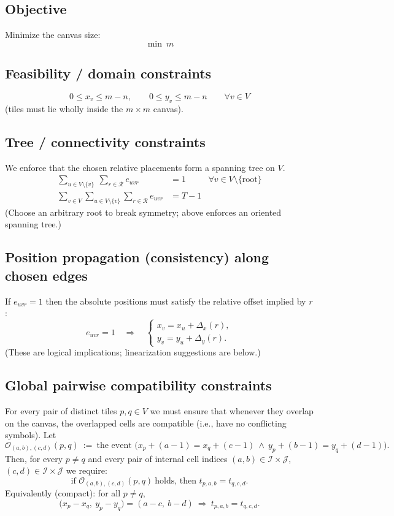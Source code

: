 \documentclass{article}
\begin{document}
\subsection*{Objective}
Minimize the canvas size:
\[
\min\ m
\]

\subsection*{Feasibility / domain constraints}
\[
0 \le x_v \le m-n,\qquad 0 \le y_v \le m-n \qquad \forall v\in V
\]
(tiles must lie wholly inside the \(m\times m\) canvas).

\subsection*{Tree / connectivity constraints}
We enforce that the chosen relative placements form a spanning tree on \(V\).
\begin{align}
\sum_{u\in V\setminus\{v\}}\ \sum_{r\in\mathcal{R}} e_{uvr} &= 1 &\forall v\in V\setminus\{\text{root}\} 
\tag{each non-root has exactly one parent (arborescence)}\\
\sum_{v\in V}\sum_{u\in V\setminus\{v\}}\sum_{r\in\mathcal{R}} e_{uvr} &= T-1
\tag{total edges = $T-1$}\label{eq:tree_edges}
\end{align}
(Choose an arbitrary root to break symmetry; above enforces an oriented spanning tree.)

\subsection*{Position propagation (consistency) along chosen edges}
If \(e_{uvr}=1\) then the absolute positions must satisfy the relative offset implied by \(r\):
\[
e_{uvr}=1 \quad\Longrightarrow\quad
\begin{cases}
x_v = x_u + \Delta_x(r),\\[4pt]
y_v = y_u + \Delta_y(r).
\end{cases}
\tag{position propagation}
\]
(These are logical implications; linearization suggestions are below.)

\subsection*{Global pairwise compatibility constraints}
For every pair of distinct tiles \(p,q\in V\) we must ensure that whenever they overlap on the canvas, the overlapped cells are compatible (i.e., have no conflicting symbols). Let
\[
\mathcal{O}_{(a,b),(c,d)}(p,q)\ :=\ \text{the event } \big(x_p + (a-1) = x_q + (c-1)\ \wedge\ y_p + (b-1) = y_q + (d-1)\big).
\]
Then, for every \(p\ne q\) and every pair of internal cell indices \((a,b)\in\mathcal{I}\times\mathcal{J}\), \((c,d)\in\mathcal{I}\times\mathcal{J}\) we require:
\[
\text{if } \mathcal{O}_{(a,b),(c,d)}(p,q)\ \text{holds, then } t_{p,a,b} = t_{q,c,d}.
\tag{compatibility}
\]
Equivalently (compact): for all \(p\ne q\),
\[
\bigl(x_p-x_q,\ y_p-y_q\bigr) = (a-c,\ b-d)\ \Longrightarrow\ t_{p,a,b}=t_{q,c,d}.
\]
\end{document}
